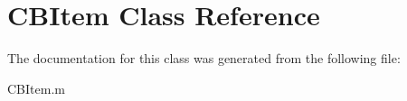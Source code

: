 \hypertarget{class_c_b_item}{\section{C\-B\-Item Class Reference}
\label{class_c_b_item}
}


The documentation for this class was generated from the following file\-:\begin{DoxyCompactItemize}
\item 
C\-B\-Item.\-m\end{DoxyCompactItemize}
